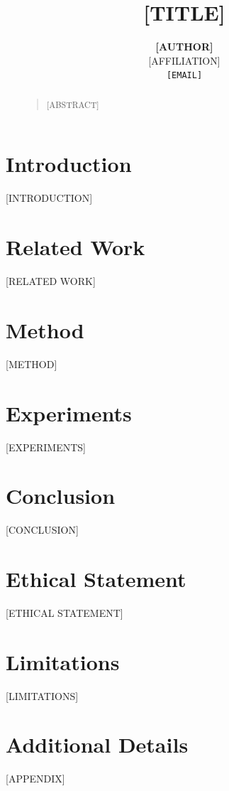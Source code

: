 \documentclass[letterpaper]{article}
\title{[TITLE]}
\author{\Large\textbf{[AUTHOR]} \\[2ex]
  [AFFILIATION] \\
  \texttt{[EMAIL]}
}
\theoremstyle{plain}
\theoremstyle{definition}
\theoremstyle{remark}
\begin{document}
\maketitle

\begin{abstract}
\begin{quote}
[ABSTRACT]
\end{quote}
\end{abstract}

\section{Introduction}
\label{sec:intro}
[INTRODUCTION]

\section{Related Work}
\label{sec:related}
[RELATED WORK]

\section{Method}
\label{sec:method}
[METHOD]

\section{Experiments}
\label{sec:experiments}
[EXPERIMENTS]

\section{Conclusion}
\label{sec:conclusion}
[CONCLUSION]

\section*{Ethical Statement}
[ETHICAL STATEMENT]

\section*{Limitations}
[LIMITATIONS]




\appendix
\section{Additional Details}
[APPENDIX]
\end{document}
